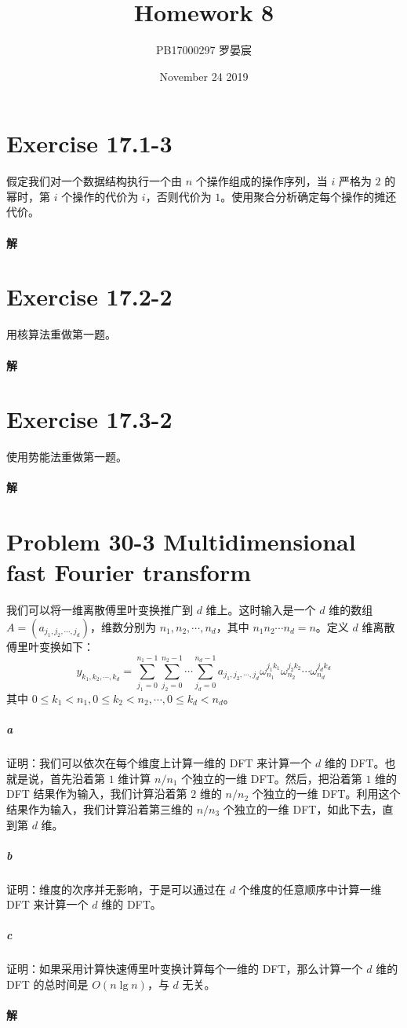 \documentclass{article}
\title{Homework 8}
\author{PB17000297 罗晏宸}
\date{November 24 2019}
\begin{document}
\maketitle

\section{Exercise 17.1-3}
假定我们对一个数据结构执行一个由 $n$ 个操作组成的操作序列，当 $i$ 严格为 $2$ 的幂时，第 $i$ 个操作的代价为 $i$，否则代价为 $1$。使用聚合分析确定每个操作的摊还代价。

\paragraph{解}

\section{Exercise 17.2-2}
用核算法重做第一题。

\paragraph{解}

\section{Exercise 17.3-2}
使用势能法重做第一题。

\paragraph{解}


\section{Problem 30-3 Multidimensional fast Fourier transform}
我们可以将一维离散傅里叶变换推广到 $d$ 维上。这时输入是一个 $d$ 维的数组 $A = (a_{j_1,j_2,\cdots,j_d})$，维数分别为 $n_1,n_2,\cdots,n_d$，其中 $n_1 n_2 \cdots n_d = n$。定义 $d$ 维离散傅里叶变换如下：
\begin{equation*}
	y_{k_1, k_2, \cdots, k_d} = \sum_{j_1 = 0}^{n_1 - 1}\sum_{j_2 = 0}^{n_2 - 1} \cdots \sum_{j_d = 0}^{n_d - 1}{a_{j_1,j_2,\cdots,j_d} \omega_{n_1}^{j_1 k_1}\omega_{n_2}^{j_2 k_2} \cdots \omega_{n_d}^{j_d k_d}}
\end{equation*}
其中 $0 \leq k_1 < n_1,0 \leq k_2 < n_2, \cdots ,0 \leq k_d < n_d$。
\subparagraph{a}证明：我们可以依次在每个维度上计算一维的 DFT 来计算一个 $d$ 维的 DFT。也就是说，首先沿着第 $1$ 维计算 $n / n_1$ 个独立的一维 DFT。然后，把沿着第 $1$ 维的 DFT 结果作为输入，我们计算沿着第 $2$ 维的 $n / n_2$ 个独立的一维 DFT。利用这个结果作为输入，我们计算沿着第三维的 $n / n_3$ 个独立的一维 DFT，如此下去，直到第 $d$ 维。
\subparagraph{b}证明：维度的次序并无影响，于是可以通过在 $d$ 个维度的任意顺序中计算一维 DFT 来计算一个 $d$ 维的 DFT。
\subparagraph{c}证明：如果采用计算快速傅里叶变换计算每个一维的 DFT，那么计算一个 $d$ 维的 DFT 的总时间是 $O(n\lg{n})$，与 $d$ 无关。

\paragraph{解}
\end{document}
